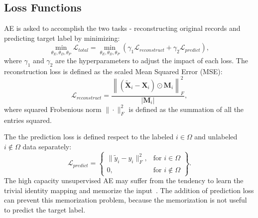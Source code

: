 
\subsection{Loss Functions}
AE is asked to accomplish the two tasks - reconstructing original records and predicting target label by minimizing:
\begin{equation}\label{eq: objective}
    \min_{\theta_E, \theta_D, \theta_P} \mathcal{L}_{total} = \min_{\theta_E, \theta_D, \theta_P}(\gamma_1\mathcal{L}_{reconstruct} + \gamma_2\mathcal{L}_{predict}),
\end{equation}
where $\gamma_1$ and $\gamma_2$ are the hyperparameters to adjust the impact of each loss.
The reconstruction loss is defined as the scaled Mean Squared Error (MSE):
\begin{equation}
    \mathcal{L}_{reconstruct} = \frac{\left\| (\tilde{\mathbf{X}}_i - \mathbf{X}_i) \odot \mathbf{M}_i \right\|_F^2}{|\mathbf{M}_i|},
\end{equation}
where squared Frobenious norm $\| \cdot \|_F^2$ is defined as the summation of all the entries squared.

The the prediction loss is defined respect to the labeled $i \in \Omega$ and unlabeled $i \not\in \Omega$ data separately:
\begin{equation}
    \mathcal{L}_{predict} = \left\{\begin{array}{lr}
        \| \tilde{y}_i - y_i \|_F^2, & \text{for } i \in \Omega\\
        0, & \text{for } i \not\in \Omega
    \end{array}\right\}.
\end{equation}
The high capacity unsupervised AE may suffer from the tendency to learn the trivial identity mapping and memorize the input~\cite{srivastava2015unsupervised}. The addition of prediction loss can prevent this memorization problem, because the memorization is not useful to predict the target label.


